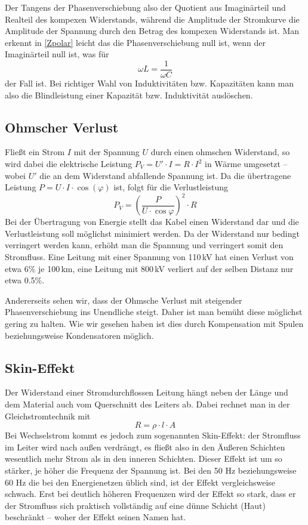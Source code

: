 Der Tangens der Phasenverschiebung also der Quotient aus Imaginärteil und Realteil des kompexen Widerstands, während die Amplitude der Stromkurve die Amplitude der Spannung durch den Betrag des kompexen Widerstands ist.
Man erkennt in \ref{Zpolar} leicht das die Phasenverschiebung null ist, wenn der Imaginärteil null ist, was für 
\begin{equation}
\omega L = \frac{1}{\omega C}
\end{equation}
der Fall ist. Bei richtiger Wahl von Induktivitäten bzw. Kapazitäten kann man also die Blindleistung einer Kapazität bzw. Induktivität auslöschen.

\subsection{Ohmscher Verlust}
Fließt ein Strom $I$ mit der Spannung $U$ durch einen ohmschen Widerstand, so wird dabei die elektrische Leistung
$P_V = U' \cdot I = R \cdot I^2$
in Wärme umgesetzt -- wobei $U'$ die an dem Widerstand abfallende Spannung ist.
Da die übertragene Leistung $P=U \cdot I \cdot \cos(\varphi)$ ist, folgt für die Verlustleistung
\[P_V = \left(\frac{P}{U \cdot \cos\varphi}\right)^2\cdot R\]
Bei der Übertragung von Energie stellt das Kabel einen Widerstand dar und die Verlustleistung soll möglichst minimiert werden. Da der Widerstand nur bedingt verringert werden kann, erhöht man die Spannung und verringert somit den Stromfluss. Eine Leitung mit einer Spannung von 110\,kV hat einen Verlust von etwa 6\% je 100\,km, eine Leitung mit 800\,kV verliert auf der selben Distanz nur etwa 0.5\%.

Andererseits sehen wir, dass der Ohmsche Verlust mit steigender Phasenverschiebung ins Unendliche steigt. Daher ist man bemüht diese möglichst gering zu halten. Wie wir gesehen haben ist dies durch Kompensation mit Spulen beziehungsweise Kondensatoren möglich.

\subsection{Skin-Effekt}
Der Widerstand einer Stromdurchflossen Leitung hängt neben der Länge und dem Material auch vom Querschnitt des Leiters ab. Dabei rechnet man in der Gleichstromtechnik mit
\begin{equation}
R = \rho \cdot l \cdot A
\end{equation}
Bei Wechselstrom kommt es jedoch zum sogenannten Skin-Effekt: der Stromfluss im Leiter wird nach außen verdrängt, es fließt also in den Äußeren Schichten wesentlich mehr Strom als in den inneren Schichten. Dieser Effekt ist um so stärker, je höher die Frequenz der Spannung ist. Bei den 50 Hz beziehungsweise 60 Hz die bei den Energienetzen üblich sind, ist der Effekt vergleichsweise schwach. Erst bei deutlich höheren Frequenzen wird der Effekt so stark, dass er der Stromfluss sich praktisch vollständig auf eine dünne Schicht (Haut) beschränkt -- woher der Effekt seinen Namen hat. 

